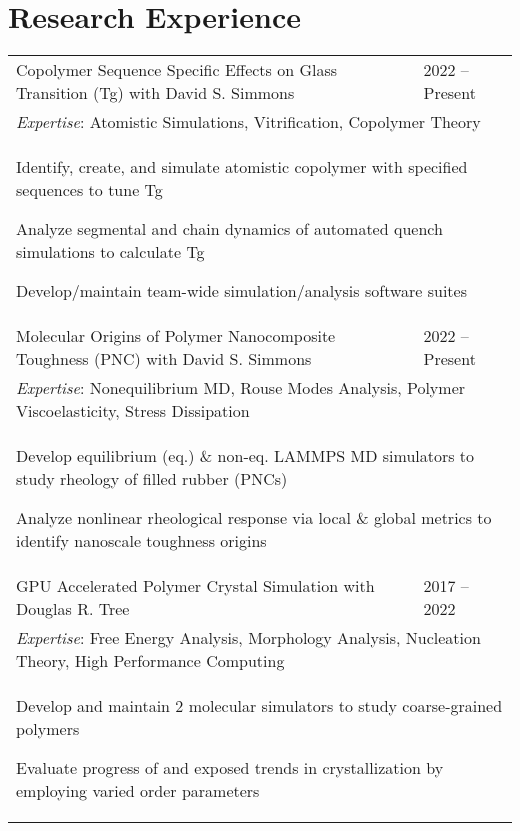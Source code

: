 \documentclass[letterpaper,11pt]{article}
\begin{document}
\section*{Research Experience}
\bgroup
\setlength\extrarowheight{-12pt}
\def\arraystretch{0.5}
\begin{tabular}{@{}p{}l@{}}
  Copolymer Sequence Specific Effects on Glass Transition (Tg) with David S. Simmons & 2022 -- Present \\
  \multicolumn{2}{p{\textwidth}}{\textit{Expertise}: Atomistic Simulations, Vitrification, Copolymer Theory} \\
  \multicolumn{2}{p{\textwidth}}{
    \begin{tabitemize} 
      \item Identify, create, and simulate atomistic copolymer with specified sequences to tune Tg
      \item Analyze segmental and chain dynamics of automated quench simulations to calculate Tg
      \item Develop/maintain team-wide simulation/analysis software suites
    \end{tabitemize}
  } \\ 

  Molecular Origins of Polymer Nanocomposite Toughness (PNC) with David S. Simmons & 2022 -- Present \\
  \multicolumn{2}{p{\textwidth}}{\textit{Expertise}: Nonequilibrium MD, Rouse Modes Analysis, Polymer Viscoelasticity, Stress Dissipation} \\
  \multicolumn{2}{p{\textwidth}}{
    \begin{tabitemize} 
      \item Develop equilibrium (eq.) \& non-eq. LAMMPS MD simulators to study rheology of filled rubber (PNCs)
      \item Analyze nonlinear rheological response via local \& global metrics to identify nanoscale toughness origins
    \end{tabitemize}
  }  \\ 

  GPU Accelerated Polymer Crystal Simulation with Douglas R. Tree & 2017 -- 2022 \\
  \multicolumn{2}{p{\textwidth}}{\textit{Expertise}: Free Energy Analysis, Morphology Analysis, Nucleation Theory, High Performance Computing} \\
  \multicolumn{2}{p{\textwidth}}{
    \begin{tabitemize} 
      \item Develop and maintain 2 molecular simulators to study coarse-grained polymers
      \item Evaluate progress of and exposed trends in crystallization by employing varied order parameters
    \end{tabitemize}
  }  \\ 


\end{tabular}
\end{document}
